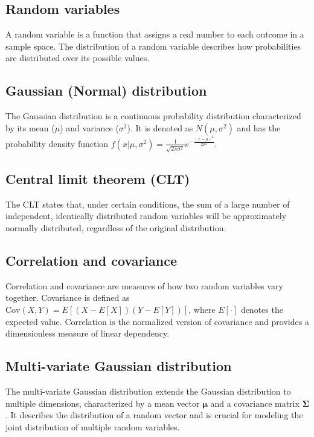 \documentclass[11pt]{book} %
\begin{document}
\subsection{Random variables}

A random variable is a function that assigns a real number to each outcome in a sample space. The distribution of a random variable describes how probabilities are distributed over its possible values.

\subsection{Gaussian (Normal) distribution}

The Gaussian distribution is a continuous probability distribution characterized by its mean (\(\mu\)) and variance (\(\sigma^2\)). It is denoted as \(N(\mu, \sigma^2)\) and has the probability density function \(f(x | \mu, \sigma^2) = \frac{1}{\sqrt{2\pi\sigma^2}} e^{-\frac{(x-\mu)^2}{2\sigma^2}}\).

\subsection{Central limit theorem (CLT)}

The CLT states that, under certain conditions, the sum of a large number of independent, identically distributed random variables will be approximately normally distributed, regardless of the original distribution.

\subsection{Correlation and covariance}

Correlation and covariance are measures of how two random variables vary together. Covariance is defined as \(\text{Cov}(X, Y) = E[(X - E[X])(Y - E[Y])]\), where \(E[\cdot]\) denotes the expected value. Correlation is the normalized version of covariance and provides a dimensionless measure of linear dependency.

\subsection{Multi-variate Gaussian distribution}

The multi-variate Gaussian distribution extends the Gaussian distribution to multiple dimensions, characterized by a mean vector \(\boldsymbol{\mu}\) and a covariance matrix \(\boldsymbol{\Sigma}\). It describes the distribution of a random vector and is crucial for modeling the joint distribution of multiple random variables.
\end{document}
